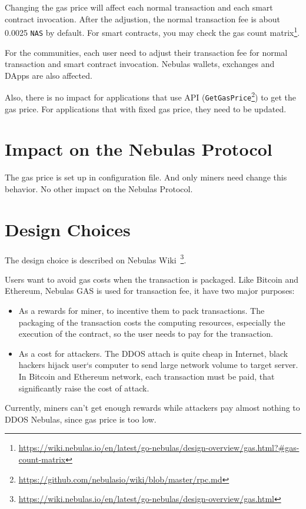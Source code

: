 \documentclass[11pt]{article}
\begin{document}
Changing the gas price will affect each normal transaction and each smart contract invocation.
After the adjustion, the normal transaction fee is about 0.0025 \texttt{NAS}
by default. For smart contracts, you may check the gas count
matrix\footnote{\url{https://wiki.nebulas.io/en/latest/go-nebulas/design-overview/gas.html?\#gas-count-matrix}}.

For the communities, each user need to adjust their transaction fee for normal transaction and smart contract invocation.
Nebulas wallets, exchanges and DApps are also affected.

Also, there is no impact for applications that use API (\texttt{GetGasPrice}\footnote{\url{https://github.com/nebulasio/wiki/blob/master/rpc.md}}) to get the gas price.
For applications that with fixed gas price, they need to be updated.

\section{Impact on the Nebulas Protocol}
The gas price is set up in configuration file. And only miners need change this behavior.
No other impact on the Nebulas Protocol.

\section{Design Choices}

The design choice is described on Nebulas Wiki~\footnote{\url{https://wiki.nebulas.io/en/latest/go-nebulas/design-overview/gas.html}}.

Users want to avoid gas costs when the transaction is packaged. Like Bitcoin and Ethereum, Nebulas GAS is used for transaction fee, it have two major purposes:
\begin{itemize}
\item As a rewards for miner, to incentive them to pack transactions. The packaging of the transaction costs the computing resources, especially the execution of the contract, so the user needs to pay for the transaction.
\item As a cost for attackers. The DDOS attach is quite cheap in Internet, black hackers hijack user‘s computer to send large network volume to target server. In Bitcoin and Ethereum network, each transaction must be paid, that significantly raise the cost of attack.
\end{itemize}

Currently, miners can't get enough rewards while attackers pay almost nothing to DDOS Nebulas,
since gas price is too low.
\end{document}
